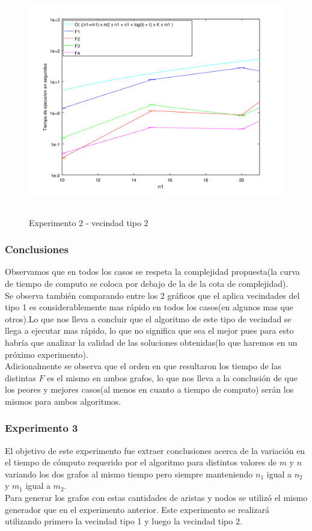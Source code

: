     \begin{figure}[H]
      \includegraphics[height=10cm]{graficos/ejercicio6-exp2-tipo2.png}
       \caption{Experimento 2 - vecindad tipo 2}
	\end{figure}

\subsubsection*{Conclusiones}\;
Observamos que en todos los casos se respeta la complejidad propuesta(la curva de tiempo de computo se coloca por debajo de la de la cota de complejidad).\\
Se observa también comparando entre los 2 gráficos que el aplica vecindades del tipo 1 es considerablemente  mas rápido en todos los casos(en algunos mas que otros).Lo que nos lleva a concluir que el algoritmo de este tipo de vecindad se llega a ejecutar mas rápido, lo que no significa que sea el mejor pues para esto habría que analizar la calidad de las soluciones obtenidas(lo que haremos en un próximo experimento).\\ 
Adicionalmente se observa que el orden en que resultaron los tiempo de las distintas $F$ es el mismo en ambos grafos, lo que nos lleva a la conclusión de que los peores y mejores casos(al menos en cuanto a tiempo de computo) serán los mismos para ambos algoritmos.



\subsubsection*{Experimento 3}\; 
    El objetivo de este experimento fue extraer conclusiones acerca de la variación en el tiempo de cómputo requerido por el algoritmo para distintos valores de $m$ y $n$ variando los dos grafos al mismo tiempo pero siempre manteniendo $n_1$ igual a $n_2$ y $m_1$ igual a $m_2$. \\
Para generar los grafos con estas cantidades de aristas y nodos se utilizó el mismo generador que en el experimento anterior.
Este experimento se realizará utilizando primero la vecindad tipo 1 y luego la vecindad tipo 2.
        
